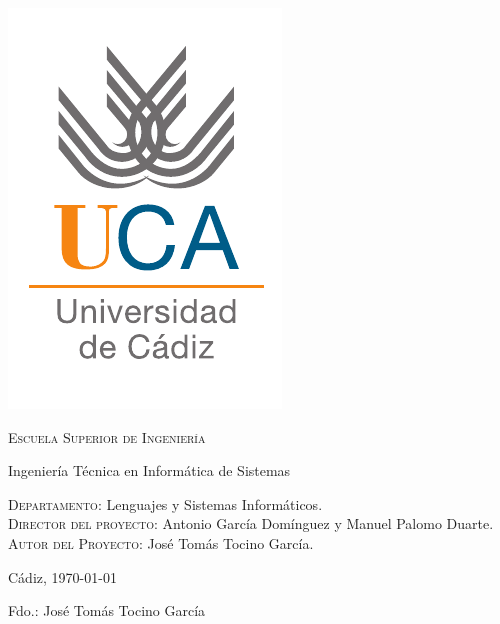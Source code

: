 {
  \thispagestyle{empty}
  \centering
  \includegraphics[width=.2\textwidth]{0_misc/logo_uca}

  \bigskip
  \bigskip
  \bigskip
  
  \begin{changemargin}{3em}{3em}

    \begin{center}
      {\Huge \textsc{\nohyphens{Escuela Superior de Ingeniería}}}
      
      \bigskip
      \bigskip
      
      {\huge \nohyphens{Ingeniería Técnica en Informática de Sistemas}}
      
      \bigskip
      \bigskip
      \bigskip
      \bigskip
      
      \begin{doublespace}
        {\LARGE \nohyphens{\nombreProyecto}}
      \end{doublespace}


      \bigskip
      \bigskip
      \bigskip
      \bigskip
      
    \end{center}
  \end{changemargin}
  \begin{changemargin}{3em}{1em}
  \begin{flushleft}
    \Large

    \textsc{Departamento}: \nohyphens{Lenguajes y Sistemas Informáticos.} \\
    \textsc{Director del proyecto}: \nohyphens{Antonio García Domínguez y Manuel Palomo Duarte.} \\
    \textsc{Autor del Proyecto}: \nohyphens{José Tomás Tocino García}. \\
  \end{flushleft}

  \end{changemargin}  

  \bigskip
  \bigskip
  \bigskip
  
  \begin{flushright}
    \large
    Cádiz, \today

    \bigskip
    \bigskip
    \bigskip
    \bigskip    
    \bigskip
    \bigskip

    Fdo.: José Tomás Tocino García
    
  \end{flushright}

}


